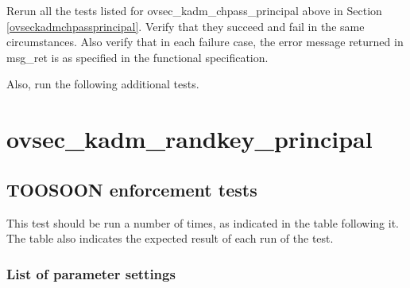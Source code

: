 Rerun all the tests listed for ovsec_kadm_chpass_principal above in
Section \ref{ovseckadmchpassprincipal}.  Verify that they succeed
and fail in the same circumstances.  Also verify that in each failure
case, the error message returned in msg_ret is as specified in the
functional specification.

Also, run the following additional tests.







\section{ovsec_kadm_randkey_principal}

\subsection{TOOSOON enforcement tests}

This test should be run a number of times, as indicated in the table
following it.  The table also indicates the expected result of each
run of the test.


\subsubsection{List of parameter settings}

